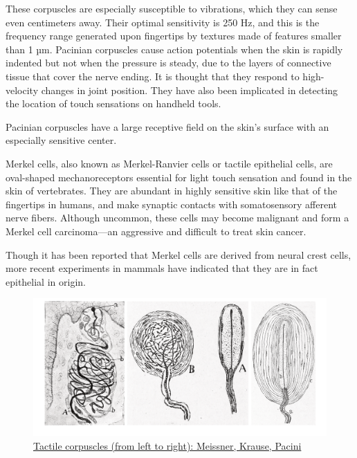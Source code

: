 These corpuscles are especially susceptible to vibrations, which they can sense even centimeters away. Their optimal sensitivity is 250 Hz, and this is the frequency range generated upon fingertips by textures made of features smaller than 1 µm. Pacinian corpuscles cause action potentials when the skin is rapidly indented but not when the pressure is steady, due to the layers of connective tissue that cover the nerve ending. It is thought that they respond to high-velocity changes in joint position. They have also been implicated in detecting the location of touch sensations on handheld tools.

Pacinian corpuscles have a large receptive field on the skin's surface with an especially sensitive center.

Merkel cells, also known as Merkel-Ranvier cells or tactile epithelial cells, are oval-shaped mechanoreceptors essential for light touch sensation and found in the skin of vertebrates. They are abundant in highly sensitive skin like that of the fingertips in humans, and make synaptic contacts with somatosensory afferent nerve fibers. Although uncommon, these cells may become malignant and form a Merkel cell carcinoma---an aggressive and difficult to treat skin cancer.

Though it has been reported that Merkel cells are derived from neural crest cells, more recent experiments in mammals have indicated that they are in fact epithelial in origin.



\begin{figure}

{\centering \includegraphics[width=0.7\linewidth]{./figures/somatosensory/TouchReceptors} 

}

\caption{\href{https://commons.wikimedia.org/wiki/File:Gray940.png}{Tactile corpuscles (from left to right): Meissner, Krause, Pacini}}\label{fig:tactilecorpuscle}
\end{figure}

